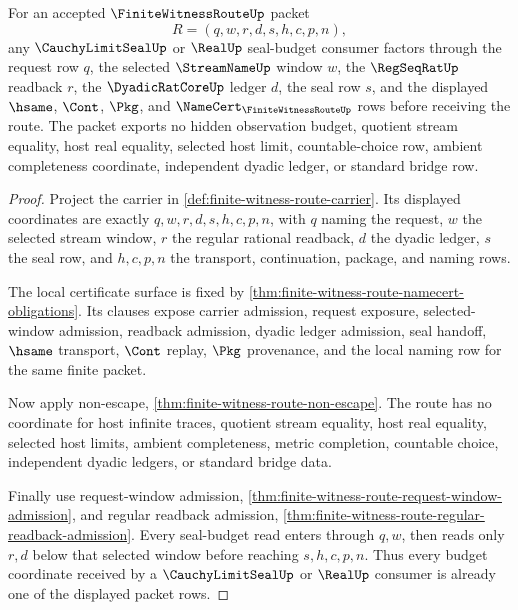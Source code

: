\begin{theorem}
\label{thm:finite-witness-route-seal-budget-exactness}
For an accepted $\FiniteWitnessRouteUp$ packet
$$
R=(q,w,r,d,s,h,c,p,n),
$$
any $\CauchyLimitSealUp$ or $\RealUp$ seal-budget consumer factors through the request row $q$, the selected $\StreamNameUp$ window $w$, the $\RegSeqRatUp$ readback $r$, the $\DyadicRatCoreUp$ ledger $d$, the seal row $s$, and the displayed $\hsame$, $\Cont$, $\Pkg$, and $\NameCert_{\FiniteWitnessRouteUp}$ rows before receiving the route. The packet exports no hidden observation budget, quotient stream equality, host real equality, selected host limit, countable-choice row, ambient completeness coordinate, independent dyadic ledger, or standard bridge row.
\end{theorem}
\begin{proof}
Project the carrier in \autoref{def:finite-witness-route-carrier}. Its displayed coordinates are exactly $q,w,r,d,s,h,c,p,n$, with $q$ naming the request, $w$ the selected stream window, $r$ the regular rational readback, $d$ the dyadic ledger, $s$ the seal row, and $h,c,p,n$ the transport, continuation, package, and naming rows.

The local certificate surface is fixed by \autoref{thm:finite-witness-route-namecert-obligations}. Its clauses expose carrier admission, request exposure, selected-window admission, readback admission, dyadic ledger admission, seal handoff, $\hsame$ transport, $\Cont$ replay, $\Pkg$ provenance, and the local naming row for the same finite packet.

Now apply non-escape, \autoref{thm:finite-witness-route-non-escape}. The route has no coordinate for host infinite traces, quotient stream equality, host real equality, selected host limits, ambient completeness, metric completion, countable choice, independent dyadic ledgers, or standard bridge data.

Finally use request-window admission, \autoref{thm:finite-witness-route-request-window-admission}, and regular readback admission, \autoref{thm:finite-witness-route-regular-readback-admission}. Every seal-budget read enters through $q,w$, then reads only $r,d$ below that selected window before reaching $s,h,c,p,n$. Thus every budget coordinate received by a $\CauchyLimitSealUp$ or $\RealUp$ consumer is already one of the displayed packet rows.
\end{proof}

